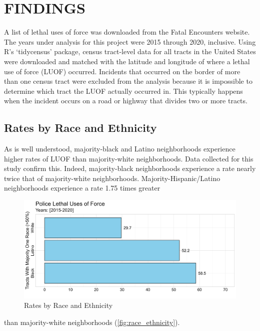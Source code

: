 \documentclass[12pt]{article}
\begin{document}
\section{FINDINGS}

A list of lethal uses of force was downloaded from the Fatal Encounters website. The years under analysis for this project were 2015 through 2020, inclusive. Using R’s ‘tidycensus’ package, census tract-level data for all tracts in the United States were downloaded and matched with the latitude and longitude of where a lethal use of force (LUOF) occurred. Incidents that occurred on the border of more than one census tract were excluded from the analysis because it is impossible to determine which tract the LUOF actually occurred in. This typically happens when the incident occurs on a road or highway that divides two or more tracts.

\subsection{Rates by Race and Ethnicity}

As is well understood, majority-black and Latino neighborhoods experience higher rates of LUOF than majority-white neighborhoods. Data collected for this study confirm this. Indeed, majority-black neighborhoods experience a rate nearly twice that of majority-white neighborhoods. Majority-Hispanic/Latino neighborhoods experience a rate 1.75 times greater

\begin{figure}[H]
  \centering %
  \includegraphics[width=\linewidth]{images/majority_race_only_ind}
  \captionsetup{justification=centering, margin=2cm}
  \caption[Rates by Race and Ethnicity]{Rates by Race and Ethnicity}
  \label{fig:race_ethnicity}
\end{figure}

\noindent{}than majority-white neighborhoods (\autoref{fig:race_ethnicity}).
\end{document}
